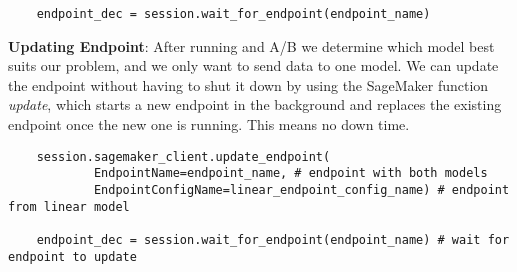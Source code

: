 \documentclass[11pt, a4paper]{article}
\begin{document}
\begin{spacing}{1.1}
\begin{lstlisting}
	endpoint_dec = session.wait_for_endpoint(endpoint_name)
	\end{lstlisting} \vspace*{2mm}
	\textbf{Updating Endpoint}: After running and A/B we determine which model best suits our problem, and we only want to send data to one model. We can update the endpoint without having to shut it down by using the SageMaker function \textit{update}, which starts a new endpoint in the background and replaces the existing endpoint once the new one is running. This means no down time.
	\begin{lstlisting}
	session.sagemaker_client.update_endpoint(
			EndpointName=endpoint_name, # endpoint with both models
			EndpointConfigName=linear_endpoint_config_name) # endpoint from linear model
	
	endpoint_dec = session.wait_for_endpoint(endpoint_name) # wait for endpoint to update
	\end{lstlisting} \newpage


\end{spacing}
\end{document}
